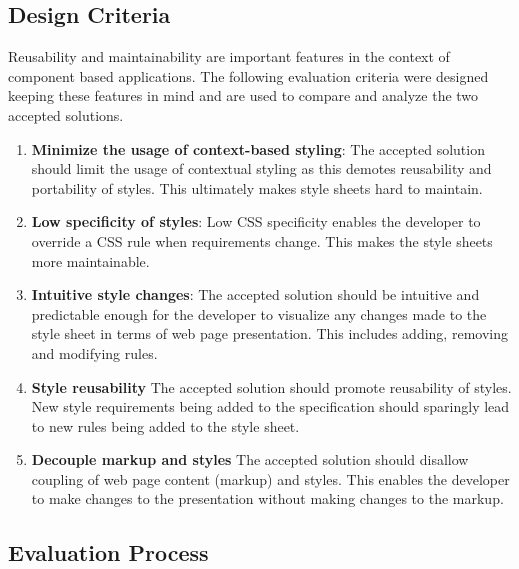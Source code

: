 \documentclass[12pt]{article}
\begin{document}
\subsection{Design Criteria}
Reusability and maintainability are important features in the context of component based applications. The following evaluation criteria were designed keeping these features in mind and are used to compare and analyze the two accepted solutions.
\begin{enumerate}

	\item \textbf{Minimize the usage of context-based styling}: The accepted solution should limit the usage of contextual styling as this demotes reusability and portability of styles. This ultimately makes style sheets hard to maintain.

	\item \textbf{Low specificity of styles}: Low CSS specificity enables the developer to override a CSS rule when requirements change. This makes the style sheets more maintainable.

	\item \textbf{Intuitive style changes}: The accepted solution should be intuitive and predictable enough for the developer to visualize any changes made to the style sheet in terms of web page presentation. This includes adding, removing and modifying rules.

	\item \textbf{Style reusability} The accepted solution should promote reusability of styles. New style requirements being added to the specification should sparingly lead to new rules being added to the style sheet.

	\item \textbf{Decouple markup and styles} The accepted solution should disallow coupling of web page content (markup) and styles. This enables the developer to make changes to the presentation without making changes to the markup.

\end{enumerate}

\subsection{Evaluation Process}

\newpage
\end{document}

